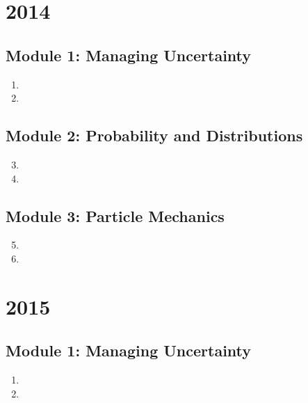 \documentclass[fleqn,titlepage]{book}
\numberwithin{equation}{section}
\theoremstyle{plain}
\theoremstyle{definition}
\theoremstyle{remark}
\begin{document}
\chapter{2014}
\section{Module 1: Managing Uncertainty}
\begin{enumerate}[label=\bfseries  \arabic*.]\setcounter{enumi}{0}
\item 
\item 
\end{enumerate}
\section{Module 2: Probability and Distributions}
\begin{enumerate}[label=\bfseries  \arabic*.]\setcounter{enumi}{2}
\item 
\item 
\end{enumerate}
\section{Module 3: Particle Mechanics}
\begin{enumerate}[label=\bfseries  \arabic*.]\setcounter{enumi}{4}
\item 
\item 
\end{enumerate}

\chapter{2015}
\section{Module 1: Managing Uncertainty}
\begin{enumerate}[label=\bfseries  \arabic*.]\setcounter{enumi}{0}
\item 
\item 
\end{enumerate}
\end{document}
